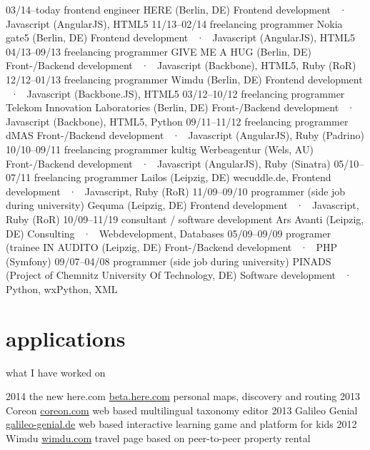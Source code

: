 \documentclass[]{friggeri-cv}
\begin{document}
\begin{entrylist}
  \entry
    {03/14–today}
    {frontend engineer}
    {HERE (Berlin, DE)}
    {Frontend development ~·~ Javascript (AngularJS), HTML5}
  \entry
    {11/13–02/14}
    {freelancing programmer}
    {Nokia gate5 (Berlin, DE)}
    {Frontend development ~·~ Javascript (AngularJS), HTML5}
  \entry
    {04/13–09/13}
    {freelancing programmer}
    {GIVE ME A HUG (Berlin, DE)}
    {Front-/Backend development ~·~ Javascript (Backbone), HTML5, Ruby (RoR)}
  \entry
    {12/12–01/13}
    {freelancing programmer}
    {Wimdu (Berlin, DE)}
    {Frontend development ~·~ Javascript (Backbone.JS), HTML5}
  \entry
    {03/12–10/12}
    {freelancing programmer}
    {Telekom Innovation Laboratories (Berlin, DE)}
    {Front-/Backend development ~·~ Javascript (Backbone), HTML5, Python}
  \entry
    {09/11–11/12}
    {freelancing programmer}
    {dMAS}
    {Front-/Backend development ~·~ Javascript (AngularJS), Ruby (Padrino)}
  \entry
    {10/10–09/11}
    {freelancing programmer}
    {kultig Werbeagentur (Wels, AU)}
    {Front-/Backend development ~·~ Javascript (AngularJS), Ruby (Sinatra)}
  \entry
    {05/10–07/11}
    {freelancing programmer}
    {Lailos (Leipzig, DE)}
    {wecuddle.de, Frontend development ~·~ Javascript, Ruby (RoR)}
  \entry
    {11/09–09/10}
    {programmer (side job during university)}
    {Gequma (Leipzig, DE)}
    {Frontend development ~·~ Javascript, Ruby (RoR)}
  \entry
    {10/09–11/19}
    {consultant / software development}
    {Ars Avanti (Leipzig, DE)}
    {Consulting ~·~ Webdevelopment, Databases}
  \entry
    {05/09–09/09}
    {programer (trainee}
    {IN AUDITO (Leipzig, DE)}
    {Front-/Backend development ~·~ PHP (Symfony)}
  \entry
    {09/07–04/08}
    {programmer (side job during university)}
    {PINADS (Project of Chemnitz University Of Technology, DE)}
    {Software development ~·~ Python, wxPython, XML}
\end{entrylist}


\section{applications}
what I have worked on

\begin{entrylist}
  \entry
    {2014}
    {the new here.com}
    {\href{https://beta.here.com}{beta.here.com}}
    {personal maps, discovery and routing}
  \entry
    {2013}
    {Coreon}
    {\href{http://coreon.com}{coreon.com}}
    {web based multilingual taxonomy editor}
  \entry
    {2013}
    {Galileo Genial}
    {\href{http://news.galileo-genial.de}{galileo-genial.de}}
    {web based interactive learning game and platform for kids}
  \entry
    {2012}
    {Wimdu}
    {\href{http://wimdu.com}{wimdu.com}}
    {travel page based on peer-to-peer property rental}
\end{entrylist}
\end{document}
